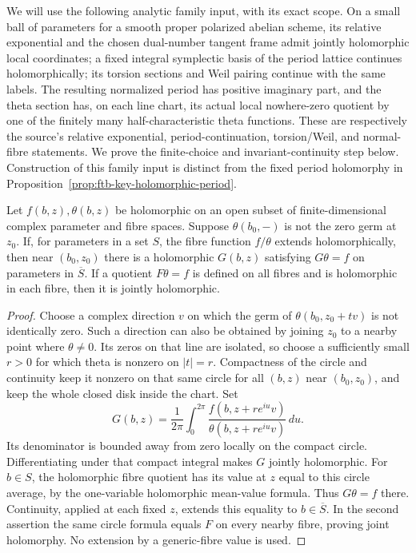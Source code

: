We will use the following analytic family input, with its exact
scope.  On a small ball of parameters for a smooth proper polarized
abelian scheme, its relative exponential and the chosen
dual-number tangent frame admit jointly holomorphic local
coordinates; a fixed integral symplectic basis of the period
lattice continues holomorphically; its torsion sections and Weil
pairing continue with the same labels.  The resulting normalized
period has positive imaginary part, and the theta section has,
on each line chart, its actual local nowhere-zero quotient by
one of the finitely many half-characteristic theta functions.
These are respectively the source's relative exponential,
period-continuation, torsion/Weil, and normal-fibre statements.
We prove the finite-choice and invariant-continuity step below.
Construction of this family input is distinct from the fixed
period holomorphy in
Proposition~\ref{prop:ftb-key-holomorphic-period}.

\begin{srlemma}
\label{lem:ftb-circle-quotient}
Let \(f(b,z),\theta(b,z)\) be holomorphic on an open subset of
finite-dimensional complex parameter and fibre spaces.
Suppose \(\theta(b_0,-)\) is not the zero germ at \(z_0\).
If, for parameters in a set \(S\), the fibre function \(f/\theta\)
extends holomorphically, then near \((b_0,z_0)\) there is a
holomorphic \(G(b,z)\) satisfying \(G\theta=f\) on parameters
in \(\overline S\).
If a quotient \(F\theta=f\) is defined on all fibres and is
holomorphic in each fibre, then it is jointly holomorphic.
\end{srlemma}
\begin{proof}
Choose a complex direction \(v\) on which the germ of
\(\theta(b_0,z_0+tv)\) is not identically zero.
Such a direction can also be obtained by joining \(z_0\) to a
nearby point where \(\theta\ne0\).
Its zeros on that line are isolated, so choose a sufficiently
small \(r>0\) for which theta is nonzero on \(|t|=r\).
Compactness of the circle and continuity keep it nonzero on
that same circle for all \((b,z)\) near \((b_0,z_0)\), and
keep the whole closed disk inside the chart.
Set
\[
 G(b,z)=\frac1{2\pi}\int_0^{2\pi}
       \frac{f(b,z+re^{iu}v)}{\theta(b,z+re^{iu}v)}\,du .
 \tag{R3}\label{eq:ftb-circle-average}
\]
Its denominator is bounded away from zero locally on the
compact circle.  Differentiating under that compact integral
makes \(G\) jointly holomorphic.
For \(b\in S\), the holomorphic fibre quotient has its value at
\(z\) equal to this circle average, by the one-variable
holomorphic mean-value formula.  Thus \(G\theta=f\) there.
Continuity, applied at each fixed \(z\), extends this equality
to \(b\in\overline S\).
In the second assertion the same circle formula equals \(F\)
on every nearby fibre, proving joint holomorphy.
No extension by a generic-fibre value is used.
\end{proof}

